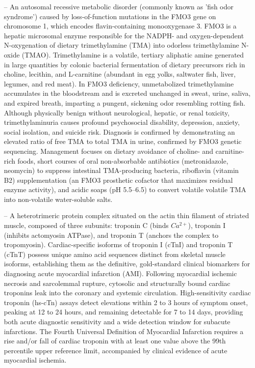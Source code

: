 -- An autosomal recessive metabolic disorder (commonly known as 'fish odor syndrome') caused by loss-of-function mutations in the FMO3 gene on chromosome 1, which encodes flavin-containing monooxygenase 3. FMO3 is a hepatic microsomal enzyme responsible for the NADPH- and oxygen-dependent N-oxygenation of dietary trimethylamine (TMA) into odorless trimethylamine N-oxide (TMAO). Trimethylamine is a volatile, tertiary aliphatic amine generated in large quantities by colonic bacterial fermentation of dietary precursors rich in choline, lecithin, and L-carnitine (abundant in egg yolks, saltwater fish, liver, legumes, and red meat). In FMO3 deficiency, unmetabolized trimethylamine accumulates in the bloodstream and is excreted unchanged in sweat, urine, saliva, and expired breath, imparting a pungent, sickening odor resembling rotting fish. Although physically benign without neurological, hepatic, or renal toxicity, trimethylaminuria causes profound psychosocial disability, depression, anxiety, social isolation, and suicide risk. Diagnosis is confirmed by demonstrating an elevated ratio of free TMA to total TMA in urine, confirmed by FMO3 genetic sequencing. Management focuses on dietary avoidance of choline- and carnitine-rich foods, short courses of oral non-absorbable antibiotics (metronidazole, neomycin) to suppress intestinal TMA-producing bacteria, riboflavin (vitamin B2) supplementation (an FMO3 prosthetic cofactor that maximizes residual enzyme activity), and acidic soaps (pH 5.5--6.5) to convert volatile volatile TMA into non-volatile water-soluble salts.

-- A heterotrimeric protein complex situated on the actin thin filament of striated muscle, composed of three subunits: troponin C (binds $Ca^{2+}$), troponin I (inhibits actomyosin ATPase), and troponin T (anchors the complex to tropomyosin). Cardiac-specific isoforms of troponin I (cTnI) and troponin T (cTnT) possess unique amino acid sequences distinct from skeletal muscle isoforms, establishing them as the definitive, gold-standard clinical biomarkers for diagnosing acute myocardial infarction (AMI). Following myocardial ischemic necrosis and sarcolemmal rupture, cytosolic and structurally bound cardiac troponins leak into the coronary and systemic circulation. High-sensitivity cardiac troponin (hs-cTn) assays detect elevations within 2 to 3 hours of symptom onset, peaking at 12 to 24 hours, and remaining detectable for 7 to 14 days, providing both acute diagnostic sensitivity and a wide detection window for subacute infarctions. The Fourth Universal Definition of Myocardial Infarction requires a rise and/or fall of cardiac troponin with at least one value above the 99th percentile upper reference limit, accompanied by clinical evidence of acute myocardial ischemia.

